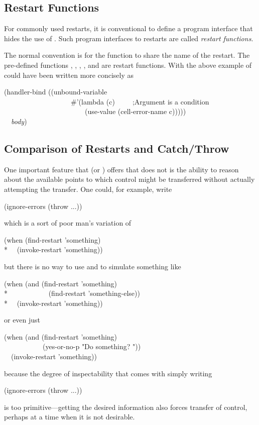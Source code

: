 \subsection{Restart Functions}

For commonly used restarts, it is conventional to define a program interface
that hides the use of . Such program interfaces to restarts
are called {\it restart functions}.

The normal convention is for the function to share the name of the restart.
The pre-defined functions , , , , and
 are restart functions. With  the above example of 
 could have been written more concisely as
\begin{lisp}
(handler-bind ((unbound-variable \\
~~~~~~~~~~~~~~~~~~~\#'(lambda (c)~~~~~;{\rm Argument  is a condition} \\
~~~~~~~~~~~~~~~~~~~~~~~(use-value (cell-error-name c))))) \\
~~{\it body})
\end{lisp}

\subsection{Comparison of Restarts and Catch/Throw}
  
One important feature that  (or ) offers that
 does not is the ability to reason about the available points to
which control might be transferred without actually attempting the
transfer. One could, for example, write
\begin{lisp}
(ignore-errors (throw ...))
\end{lisp}
which is a sort of poor man's variation of
\begin{lisp}
(when (find-restart 'something) \\*
~~(invoke-restart 'something))
\end{lisp}
but there is no way to use  and  to simulate something
like
\begin{lisp}
(when (and (find-restart 'something) \\*
~~~~~~~~~~~(find-restart 'something-else)) \\*
~~(invoke-restart 'something))
\end{lisp}
or even just
\begin{lisp}
(when (and (find-restart 'something) \\
~~~~~~~~~~~(yes-or-no-p "Do something? ")) \\
~~(invoke-restart 'something))
\end{lisp}
because the degree of inspectability that comes with simply writing
\begin{lisp}
(ignore-errors (throw ...))
\end{lisp}
is too primitive---getting the desired information also forces
transfer of control, perhaps at a time when it is not desirable.

